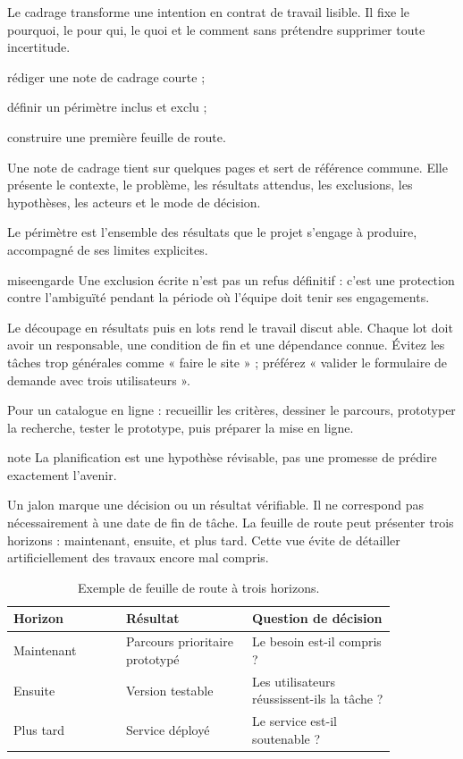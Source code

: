 \documentclass[12pt,twoside]{upbcours}
\begin{document}
\introduction
\begin{survol}
  Le cadrage transforme une intention en contrat de travail lisible. Il fixe le pourquoi, le pour
  qui, le quoi et le comment sans prétendre supprimer toute incertitude.
\end{survol}
\begin{objectifs}
  \item rédiger une note de cadrage courte ;
  \item définir un périmètre inclus et exclu ;
  \item construire une première feuille de route.
\end{objectifs}
Une note de cadrage tient sur quelques pages et sert de référence commune. Elle présente le contexte,
le problème, les résultats attendus, les exclusions, les hypothèses, les acteurs et le mode de décision.
\begin{definition}[Périmètre]
  Le périmètre est l'ensemble des résultats que le projet s'engage à produire, accompagné de ses
  limites explicites.
\end{definition}
\begin{icone}{miseengarde}
  Une exclusion écrite n'est pas un refus définitif : c'est une protection contre l'ambiguïté
  pendant la période où l'équipe doit tenir ses engagements.
\end{icone}
Le découpage en résultats puis en lots rend le travail discut able. Chaque lot doit avoir un
responsable, une condition de fin et une dépendance connue. Évitez les tâches trop générales
comme « faire le site » ; préférez « valider le formulaire de demande avec trois utilisateurs ».
\begin{exemple}
  Pour un catalogue en ligne : recueillir les critères, dessiner le parcours, prototyper la
  recherche, tester le prototype, puis préparer la mise en ligne.
\end{exemple}
\begin{icone}{note}
  La planification est une hypothèse révisable, pas une promesse de prédire exactement l'avenir.
\end{icone}
Un jalon marque une décision ou un résultat vérifiable. Il ne correspond pas nécessairement à une
date de fin de tâche. La feuille de route peut présenter trois horizons : maintenant, ensuite,
et plus tard. Cette vue évite de détailler artificiellement des travaux encore mal compris.
\begin{table}[ht]
  \centering
  \begin{tabular}{p{0.25\linewidth}p{0.28\linewidth}p{0.32\linewidth}}
    \toprule
    Horizon & Résultat & Question de décision\\
    \midrule
    Maintenant & Parcours prioritaire prototypé & Le besoin est-il compris ?\\
    Ensuite & Version testable & Les utilisateurs réussissent-ils la tâche ?\\
    Plus tard & Service déployé & Le service est-il soutenable ?\\
    \bottomrule
  \end{tabular}
  \caption{Exemple de feuille de route à trois horizons.}
\end{table}
\end{document}
